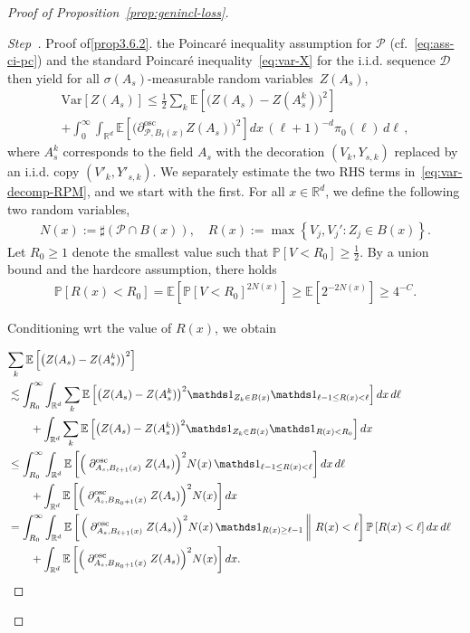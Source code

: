 \documentclass[AHL,Unicode,longabstracts]{cedram}
\newcommand{\R}{\mathbb R}
\newcommand{\expec}[1]{\mathbb{E}\left[#1 \right]}
\newcommand{\pr}[1]{\mathbb{P}\left[#1 \right]}
\newcommand{\expeC}[2]{\mathbb{E}\left[\left. #1 \,\right\|\,#2\right]}
\newcommand{\Pc}{\mathcal P}
\newcommand{\Dc}{\mathcal D}
\newcommand{\osc}{\partial^{\mathrm{osc}}}
\newcommand{\oscd}[1]{\mathrel{\osc_{#1}}}
\newcommand{\var}[1]{\mathrm{Var}\left[#1\right]}
\newcounter{stepcount}
\newenvironment{step}{\refstepcounter{stepcount}\begin{proof}[Step~\thestepcount]}{\let\qed\relax\end{proof}}
\begin{document}
\begin{proof}[Proof of Proposition~\ref{prop:genincl-loss}]
\begin{step}{Proof of\eqref{prop3.6.2}.}
\goodbreak
\noindent the Poincaré inequality assumption for $\Pc$ (cf.~\eqref{eq:ass-ci-pc}) and the standard Poincaré inequality~\eqref{eq:var-X} for the i.i.d. sequence $\Dc$ then yield for all $\sigma(A_s)$-measurable random variables~$Z(A_s)$,
\begin{multline}\label{eq:var-decomp-RPM}
\var{Z(A_s)}\le \frac12\sum_{k}\expec{\big(Z(A_s)-Z(A_s^k)\big)^2}\\
+\int_0^\infty\int_{\R^d}\expec{\Big(\oscd{\Pc,B_{\ell}(x)}Z(A_s)\Big)^2}dx\,(\ell+1)^{-d}\pi_0(\ell)\,d\ell\,,
\end{multline}
where $A^k_s$ corresponds to the field $A_s$ with the decoration $(V_k,Y_{s,k})$ replaced by an i.i.d. copy $(V'_k,Y'_{s,k})$. We separately estimate the two RHS terms in~\eqref{eq:var-decomp-RPM}, and we start with the first. For all $x\in\R^d$, we define the following two random variables,
\begin{align*}
N(x):=\sharp(\Pc\cap B(x)),\quad R(x):=\max\left\{V_j,V_j':Z_j\in B(x)\right\}.
\end{align*}
Let $R_0\ge1$ denote the smallest value such that $\pr{V<R_0}\ge\frac12$. By a union bound and the hardcore assumption, there holds
\begin{align}\label{eq:choice-R0-SGRPM}
\pr{R(x)<R_0}=\expec{\pr{V<R_0}^{2N(x)}}\ge \expec{2^{-2N(x)}}\ge 4^{-C}.
\end{align}


Conditioning wrt the value of $R(x)$, we obtain


\begin{align*}
\lefteqn{\sum_{k}\expec{\big(Z(A_s)-Z(A_s^k)\big)^2}}\\
&\lesssim\int_{R_0}^\infty\int_{\R^d}\sum_{k}\expec{\big(Z(A_s)-Z(A_s^k)\big)^2\mathds1_{Z_k\in B(x)}\mathds1_{\ell-1\le R(x)<\ell}}dx\,d\ell\\
&\qquad+\int_{\R^d}\sum_{k}\expec{\big(Z(A_s)-Z(A_s^k)\big)^2\mathds1_{Z_k\in B(x)}\mathds1_{R(x)<R_0}}dx\\
&\le\int_{R_0}^\infty\int_{\R^d}\expec{\Big(\oscd{A_s,B_{\ell+1}(x)}Z(A_s)\Big)^2N(x)\,\mathds1_{\ell-1\le R(x)<\ell}}dx\,d\ell\\
&\qquad+\int_{\R^d}\expec{\Big(\oscd{A_s,B_{R_0+1}(x)}Z(A_s)\Big)^2N(x)}dx\\
&=\int_{R_0}^\infty\int_{\R^d}\expeC{\Big(\oscd{A_s,B_{\ell+1}(x)}Z(A_s)\Big)^2N(x)\,\mathds1_{R(x)\ge\ell-1}}{R(x)<\ell}\pr{R(x)<\ell}dx\,d\ell\\
&\qquad+\int_{\R^d}\expec{\Big(\oscd{A_s,B_{R_0+1}(x)}Z(A_s)\Big)^2N(x)}dx.
\end{align*}


\end{step}
\end{proof}
\end{document}
